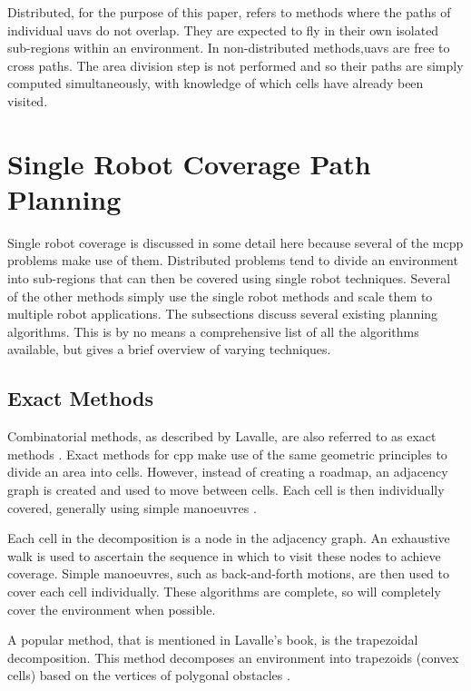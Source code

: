 Distributed, for the purpose of this paper, refers to methods where the paths of individual \acp{uav} do not overlap. They are expected to fly in their own isolated sub-regions within an environment. In non-distributed methods,\acsp{uav} are free to cross paths. The area division step is not performed and so their paths are simply computed simultaneously, with knowledge of which cells have already been visited. \cite{Juan2018}

\section{Single Robot Coverage Path Planning}
\label{sec:LR sCPP}
Single robot coverage is discussed in some detail here because several of the \ac{mcpp} problems make use of them. Distributed problems tend to divide an environment into sub-regions that can then be covered using single robot techniques. Several of the other methods simply use the single robot methods and scale them to multiple robot applications. The subsections discuss several existing planning algorithms. This is by no means a comprehensive list of all the algorithms available, but gives a brief overview of varying techniques.%
\subsection{Exact Methods}
\label{sec:LR - sExact}
Combinatorial methods, as described by Lavalle, are also referred to as exact methods \cite{Lavalle2006}. Exact methods for \ac{cpp} make use of the same geometric principles to divide an area into cells. However, instead of creating a roadmap, an adjacency graph is created and used to move between cells. Each cell is then individually covered, generally using simple manoeuvres \cite{CPP-Survey-2013}. 

Each cell in the decomposition is a node in the adjacency graph. An exhaustive walk is used to ascertain the sequence in which to visit these nodes to achieve coverage. Simple manoeuvres, such as back-and-forth motions, are then used to cover each cell individually. These algorithms are complete, so will completely cover the environment when possible. \cite{Choset-Bous1997}

A popular method, that is mentioned in Lavalle's book, is the trapezoidal decomposition. This method decomposes an environment into trapezoids (convex cells) based on the vertices of polygonal obstacles \cite{Lavalle2006}.

